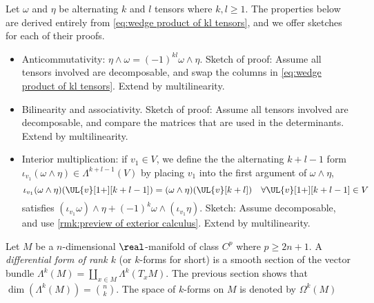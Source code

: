 \documentclass[../main-v2-manifolds.tex]{subfiles}
\begin{document}
Let $\omega$ and $\eta$ be alternating $k$ and $l$ tensors where $k,l\geq 1$. The properties below are derived entirely from \cref{eq:wedge product of kl tensors}, and we offer sketches for each of their proofs.
\begin{itemize}
    \item Anticommutativity: $\eta\wedge\omega = (-1)^{kl}\omega\wedge\eta$. Sketch of proof: Assume all tensors involved are decomposable, and swap the columns in \cref{eq:wedge product of kl tensors}. Extend by multilinearity.
    \item Bilinearity and associativity. Sketch of proof: Assume all tensors involved are decomposable, and compare the matrices that are used in the determinants. Extend by multilinearity.
    \item Interior multiplication: if $v_1\in V$, we define the the alternating $k+l-1$ form $\iota_{v_1}(\omega\wedge \eta)\in \Lambda^{k+l-1}(V)$ by placing $v_1$ into the first argument of $\omega\wedge\eta$,
    \[
        \iota_{v_1}(\omega\wedge\eta)(\UL{v}[1+][k+l-1]) = (\omega\wedge\eta)(\UL{v}[k+l])\quad\forall \UL{v}[1+][k+l-1]\in V
    \]
    satisfies $(\iota_{v_1}\omega)\wedge \eta + (-1)^{k} \omega\wedge(\iota_{v_1}\eta)$. Sketch: Assume decomposable, and use \cref{rmk:preview of exterior calculus}. Extend by multilinearity.
\end{itemize}

Let $M$ be a $n$-dimensional $\real$-manifold of class $C^p$ where $p\geq2n+1$. A \emph{differential form of rank $k$} (or $k$-forms for short) is a smooth section of the vector bundle $\Lambda^k(M) = \coprod_{x\in M}\Lambda^k(T_xM)$. The previous section shows that $\dim(\Lambda^k(M)) = \binom{n}{k}$. The space of $k$-forms on $M$ is denoted by $\Omega^k(M)$\\
\end{document}
